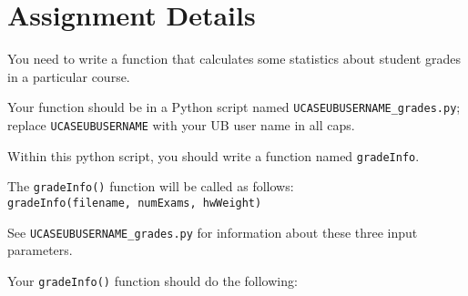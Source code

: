 \documentclass[11pt,oneside]{article}
\begin{document}
\section*{Assignment Details}

You need to write a function that calculates some statistics about student grades in a particular course.

\begin{itemize*}
	\item Your function should be in a Python script named \texttt{UCASEUBUSERNAME\_grades.py}; replace \texttt{UCASEUBUSERNAME} with your UB user name in all caps.
	
	\item Within this python script, you should write a function named \texttt{gradeInfo}.
	
	\item The \texttt{gradeInfo()} function will be called as follows: \\
		\texttt{gradeInfo(filename, numExams, hwWeight)}
		
		\begin{itemize*}
			\item See \texttt{UCASEUBUSERNAME\_grades.py} for information about these three input parameters.
		\end{itemize*}		
\end{itemize*}

Your \texttt{gradeInfo()} function should do the following:
\end{document}
